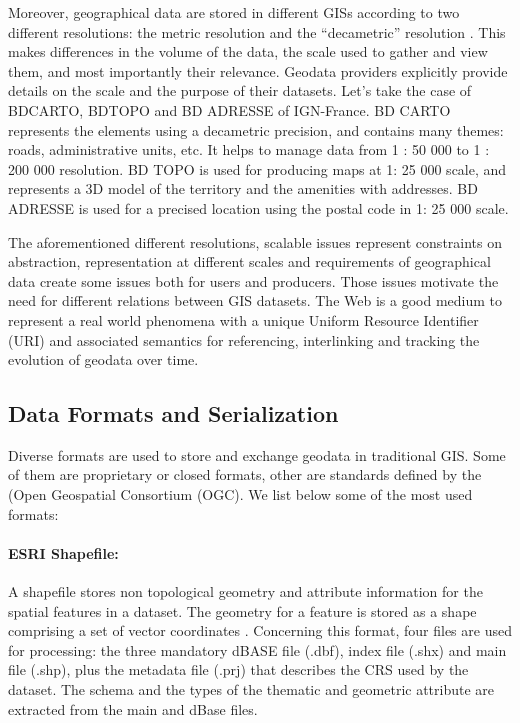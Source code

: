 Moreover, geographical data are stored in different GISs according to two different resolutions: the metric resolution and the ``decametric'' resolution \cite{anamaria08}. This makes differences in the volume of the data, the scale used to gather and view them, and most importantly their relevance. Geodata providers explicitly provide details on the scale and the purpose of their datasets. Let's take the case of BDCARTO\circledR \hspace{1pt}, BDTOPO\circledR \hspace{1pt} and BD ADRESSE\circledR \hspace{1pt} of IGN-France. BD CARTO\circledR \hspace{1pt} represents the elements using a decametric precision, and contains many themes: roads, administrative units, etc. It helps to manage data from 1 : 50 000 to 1 : 200 000 resolution.  BD TOPO is used for producing maps at 1: 25 000 scale, and represents a 3D model of the territory and the amenities with addresses. BD ADRESSE is used for a precised location using the postal code in 1: 25 000 scale. 

The aforementioned different resolutions, scalable issues represent constraints on abstraction, representation at different scales and requirements of geographical data create some issues both for users and producers. Those issues motivate the need for different relations between GIS datasets. The Web is a good medium to represent a real world phenomena with a unique Uniform Resource Identifier (URI) and associated semantics for referencing, interlinking and tracking the evolution of geodata over time. 
 

\subsection{Data Formats and Serialization}
Diverse formats are used to store and exchange geodata in traditional GIS. Some of them are proprietary or closed formats, other are standards defined by the (Open Geospatial Consortium (OGC). We list below some of the most used formats:
 
 \paragraph{ESRI Shapefile:}
 
 A shapefile stores non topological geometry and attribute information for the spatial
features in a dataset. The geometry for a feature is stored as a shape comprising a set of
vector coordinates \cite{esri98}. Concerning this format, four files are used for processing: the three mandatory dBASE file (.dbf), index file (.shx) and main file (.shp), plus the metadata file (.prj) that describes the CRS used by the dataset. The schema and the types of the thematic and geometric attribute are extracted from the main and dBase files.

